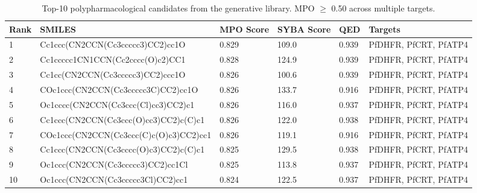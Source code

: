
\begin{table}[htbp]
\centering
\caption{Top-10 polypharmacological candidates from the generative library. MPO $\geq$ 0.50 across multiple targets. \label{tab:sm_s20_top10_retrosynthesis}}
\small
\begin{tabular}{l l l l l l}
\toprule
Rank & SMILES & MPO Score & SYBA Score & QED & Targets \\
\midrule
1 & Cc1ccc(CN2CCN(Cc3ccccc3)CC2)cc1O & 0.829 & 109.0 & 0.939 & PfDHFR, PfCRT, PfATP4 \\
2 & Cc1ccccc1CN1CCN(Cc2cccc(O)c2)CC1 & 0.828 & 124.9 & 0.939 & PfDHFR, PfCRT, PfATP4 \\
3 & Cc1cc(CN2CCN(Cc3ccccc3)CC2)ccc1O & 0.826 & 100.6 & 0.939 & PfDHFR, PfCRT, PfATP4 \\
4 & COc1ccc(CN2CCN(Cc3ccccc3C)CC2)cc1O & 0.826 & 133.7 & 0.916 & PfDHFR, PfCRT, PfATP4 \\
5 & Oc1cccc(CN2CCN(Cc3ccc(Cl)cc3)CC2)c1 & 0.826 & 116.0 & 0.937 & PfDHFR, PfCRT, PfATP4 \\
6 & Cc1ccc(CN2CCN(Cc3ccc(O)cc3)CC2)c(C)c1 & 0.826 & 122.0 & 0.938 & PfDHFR, PfCRT, PfATP4 \\
7 & COc1ccc(CN2CCN(Cc3ccc(C)c(O)c3)CC2)cc1 & 0.826 & 119.1 & 0.916 & PfDHFR, PfCRT, PfATP4 \\
8 & Cc1ccc(CN2CCN(Cc3cccc(O)c3)CC2)c(C)c1 & 0.825 & 129.5 & 0.938 & PfDHFR, PfCRT, PfATP4 \\
9 & Oc1ccc(CN2CCN(Cc3ccccc3)CC2)cc1Cl & 0.825 & 113.8 & 0.937 & PfDHFR, PfCRT, PfATP4 \\
10 & Oc1ccc(CN2CCN(Cc3ccccc3Cl)CC2)cc1 & 0.824 & 122.5 & 0.937 & PfDHFR, PfCRT, PfATP4 \\
\bottomrule
\end{tabular}
\end{table}

